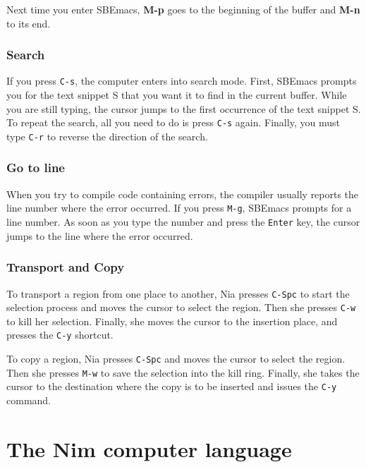 \documentclass[
  12pt,
]{book}
\begin{document}
Next time you enter SBEmacs, \textbf{M-p} goes to the beginning of the
buffer and \textbf{M-n} to its end.

\subsection*{Search}\label{Search}

If you press \texttt{C-s}, the computer enters into search mode. First,
SBEmacs prompts you for the text snippet S that you want it to find in
the current buffer. While you are still typing, the cursor jumps to the
first occurrence of the text snippet S. To repeat the search, all you
need to do is press \texttt{C-s} again. Finally, you must type
\texttt{C-r} to reverse the direction of the search.

\subsection*{Go to line}\label{Go}

When you try to compile code containing errors, the compiler usually
reports the line number where the error occurred. If you press
\texttt{M-g}, SBEmacs prompts for a line number. As soon as you type the
number and press the \texttt{Enter} key, the cursor jumps to the line
where the error occurred.

\subsection*{Transport and Copy}\label{Transport}

To transport a region from one place to another, Nia presses
\texttt{C-Spc} to start the selection process and moves the cursor to
select the region. Then she presses \texttt{C-w} to kill her selection.
Finally, she moves the cursor to the insertion place, and presses the
\texttt{C-y} shortcut.

To copy a region, Nia presses \texttt{C-Spc} and moves the cursor to
select the region. Then she presses \texttt{M-w} to save the selection
into the kill ring. Finally, she takes the cursor to the destination
where the copy is to be inserted and issues the \texttt{C-y} command.

\chapter{The Nim computer language}\label{the-nim-computer-language}
\end{document}
